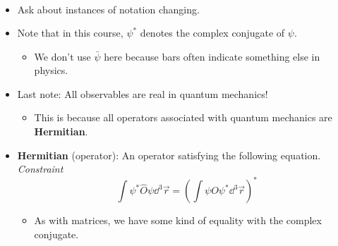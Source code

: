 \documentclass[../notes.tex]{subfiles}
\begin{document}
\begin{itemize}
\begin{itemize}
\begin{align*}
        \end{align*}
    \end{itemize}
    \item Ask about instances of notation changing.
    \item Note that in this course, $\psi^*$ denotes the complex conjugate of $\psi$.
    \begin{itemize}
        \item We don't use $\bar{\psi}$ here because bars often indicate something else in physics.
    \end{itemize}
    \item Last note: All observables are real in quantum mechanics!
    \begin{itemize}
        \item This is because all operators associated with quantum mechanics are \textbf{Hermitian}.
    \end{itemize}
    \item \textbf{Hermitian} (operator): An operator satisfying the following equation. \emph{Constraint}
    \begin{equation*}
        \int\psi^*\hat{O}\psi\dd^3\vec{r} = \left( \int\psi O\psi^*\dd^3\vec{r} \right)^*
    \end{equation*}
    \begin{itemize}
        \item As with matrices, we have some kind of equality with the complex conjugate.
    \end{itemize}
\end{itemize}
\end{document}
